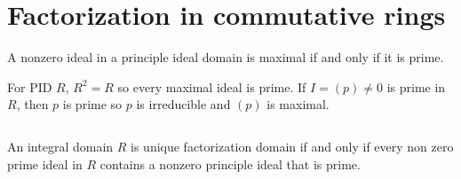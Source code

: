 \section{Factorization in commutative rings}
\begin{ex}
    A nonzero ideal in a principle ideal domain is maximal if and only if it is prime.
\end{ex}

\begin{answer}
    For PID $R$, $R^{2}=R$ so every maximal ideal is prime. If $I=(p)\neq 0$ is prime in $R$, then $p$ is prime so $p$ is irreducible and $(p)$ is maximal.
\end{answer}

$$ $$

\begin{ex}
    An integral domain $R$ is unique factorization domain if and only if every non zero prime ideal in $R$ contains a nonzero principle ideal that is prime.
\end{ex}

